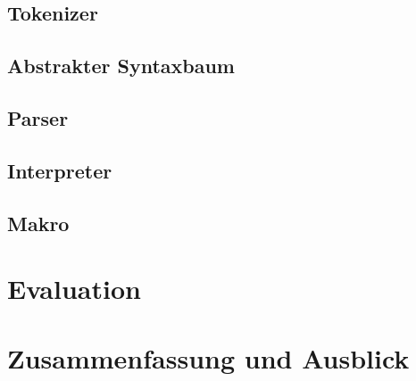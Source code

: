   \subsection{Tokenizer}
  \label{ssec:Tokenizer}

  \subsection{Abstrakter Syntaxbaum}
  \label{ssec:Abstrakter Syntaxbaum}

  \subsection{Parser}
  \label{ssec:Parser}

  \subsection{Interpreter}
  \label{ssec:Interpreter}

  \subsection{Makro}
  \label{ssec:Makro}

\section{Evaluation}
\label{sec:Evaluation}

\section{Zusammenfassung und Ausblick}
\label{sec:Zusammenfassung und Ausblick}

